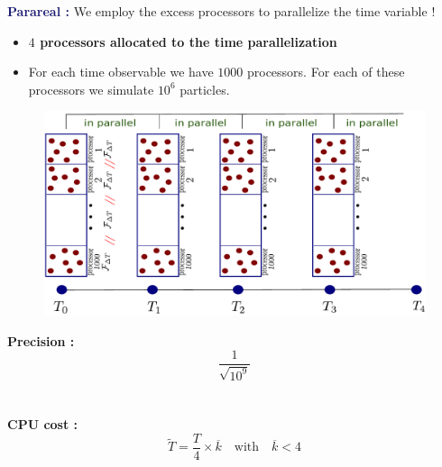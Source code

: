 \documentclass[aspectratio=169]{beamer}
\begin{document}
\begin{frame}[noframenumbering]
\textcolor{midnightblue}{\textbf{Parareal :}} We employ the excess processors to parallelize the time variable !
\\
\vspace*{0.2 cm}
\begin{itemize}
\item \textcolor{cadmiumgreen}{\textbf{$4$ processors allocated to the time parallelization}}
\vspace*{0.2 cm}
\item For each time observable we have $1000$ processors.
  For each of these processors we simulate $10^6$ particles.
\end{itemize}
\begin{minipage}{0.7 \textwidth}
\begin{figure}
  \centering
\includegraphics[scale = 0.42]{image/time_parallelization}
\end{figure}
\end{minipage}
\hfill
\begin{minipage}{0.29 \textwidth}
  \textcolor{cadmiumgreen}{\textbf{Precision :}}
  \begin{equation*}
    \frac{1}{\sqrt{10^9}}
    \end{equation*}
  \\\\
  \textcolor{cadmiumgreen}{\textbf{CPU cost :}}
  \\
  \begin{equation*}
    \widetilde{T} = \frac{T}{4} \times \overline{k} \quad \text{with} \quad \overline{k} < 4
    \end{equation*}
  \end{minipage}

\end{frame}
\end{document}
